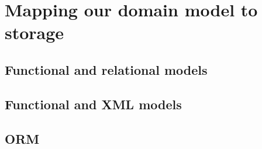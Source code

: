 \section{Mapping our domain model to storage}

\subsection{Functional and relational models}

\subsection{Functional and XML models}

\subsection{ORM}

